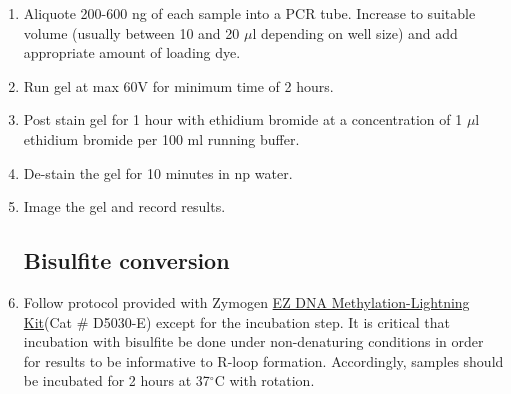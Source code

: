 \documentclass[12pt]{article}
\theoremstyle{definition}
\begin{document}
\begin{enumerate}
\item Aliquote 200-600 ng of each sample into a PCR tube. Increase to suitable volume (usually between 10 and 20 $\mu$l depending on well size) and add appropriate amount of loading dye. 

\item Run gel at max 60V for minimum time of 2 hours.

\item Post stain gel for 1 hour with ethidium bromide at a concentration of 1 $\mu$l ethidium bromide per 100 ml running buffer. 

\item De-stain the gel for 10 minutes in np water.

\item Image the gel and record results.

\subsection*{Bisulfite conversion}

\item Follow protocol provided with Zymogen \href{https://www.zymoresearch.com/collections/ez-dna-methylation-lightning-kits/products/ez-dna-methylation-lightning-kit}{EZ DNA Methylation-Lightning Kit}(Cat \# D5030-E) except for the incubation step. It is critical that incubation with bisulfite be done under non-denaturing conditions in order for results to be informative to R-loop formation. Accordingly, samples should be incubated for 2 hours at 37$^{\circ}$C with rotation. 




\end{enumerate}
\end{document}

